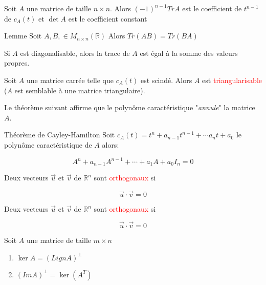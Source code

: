         \begin{theoreme}
            Soit $A$ une matrice de taille $n \times n$. Alors $(-1)^{n-1}TrA$ est le coefficient de $t^{n-1}$ de $c_A(t)$ et $\det A$ est le coefficient constant
        \end{theoreme}
        \begin{theoreme}{Lemme}
            Soit $A, B, \in M_{n \times n}(\mathbb{R}) $ Alors $Tr(AB) = Tr(BA)$
        \end{theoreme}
        \begin{theoreme}
            Si $A$ est diagonalisable, alors la trace de $A$ est égal à la somme des valeurs propres.
        \end{theoreme}
    \begin{theoreme}
        Soit $A$ une matrice carrée telle que $c_A(t)$ est scindé. Alors $A$ est  \textcolor{red}{triangularisable} ($A$ est semblable à une matrice triangulaire).
    \end{theoreme}
    Le théorème suivant affirme que le polynôme caractéristique "\textit{annule}" la matrice $A$.
    \begin{theoreme}{Théorème de Cayley-Hamilton}
        Soit $c_A(t) = t^n + a_{n-1}t^{n-1} + \cdots a_n t + a_0$ le polynôme caractéristique de $A$ alors:
        \begin{formule}
            \[A^n + a_{n-1}A^{n-1} + \cdots + a_1A + a_0I_n = 0\]
        \end{formule}
    \end{theoreme}
    \begin{definition}
        Deux vecteurs $\vec{u}$ et $\vec{v}$ de $\mathbb{R}^n$ sont \textcolor{red}{orthogonaux} si 
        \begin{formule}
            \[\vec{u}\cdot \vec{v} = 0\]
        \end{formule}
    \end{definition}
    \begin{definition}
        Deux vecteurs $\vec{u}$ et $\vec{v}$ de $\mathbb{R}^n$ sont \textcolor{red}{orthogonaux} si 
        \begin{formule}
            \[\vec{u}\cdot \vec{v} = 0\]
        \end{formule}
    \end{definition}
    \begin{theoreme}
        Soit $A$ une matrice de taille $m \times n$
        \begin{enumerate}
            \item $\ker A = (LignA)^\perp$
            \item $(ImA)^\perp = \ker(A^T)$
        \end{enumerate}
    \end{theoreme}
